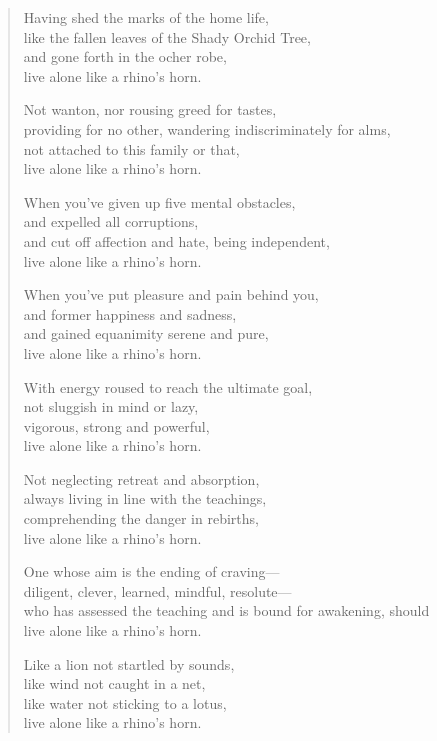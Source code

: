 \documentclass[12pt,openany]{book}%
\begin{document}
\begin{verse}
Having shed the marks of the home life, \\
like the fallen leaves of the Shady Orchid Tree, \\
and gone forth in the ocher robe, \\
live alone like a rhino’s horn. 

Not wanton, nor rousing greed for tastes, \\
providing for no other, wandering indiscriminately for alms, \\
not attached to this family or that, \\
live alone like a rhino’s horn. 

When you’ve given up five mental obstacles, \\
and expelled all corruptions, \\
and cut off affection and hate, being independent, \\
live alone like a rhino’s horn. 

When you’ve put pleasure and pain behind you, \\
and former happiness and sadness, \\
and gained equanimity serene and pure, \\
live alone like a rhino’s horn. 

With energy roused to reach the ultimate goal, \\
not sluggish in mind or lazy, \\
vigorous, strong and powerful, \\
live alone like a rhino’s horn. 

Not neglecting retreat and absorption, \\
always living in line with the teachings, \\
comprehending the danger in rebirths, \\
live alone like a rhino’s horn. 

One whose aim is the ending of craving—\\
diligent, clever, learned, mindful, resolute—\\
who has assessed the teaching and is bound for awakening, should \\
live alone like a rhino’s horn. 

Like a lion not startled by sounds, \\
like wind not caught in a net, \\
like water not sticking to a lotus, \\
live alone like a rhino’s horn. 


\end{verse}
\end{document}
